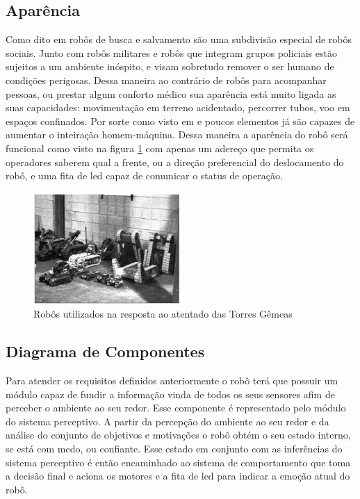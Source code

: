 \documentclass[
	article,			%
	11pt,				%
	oneside,			%
	a4paper,			%
	english,			%
	brazil,				%
	sumario=tradicional	
	]{abntex2}
\begin{document}
\subsection{Aparência}

Como dito em \cite{Robin2004} robôs de busca e salvamento são uma subdivisão especial de robôs sociais. Junto com robôs militares e robôs que integram grupos policiais estão sujeitos a um ambiente inóspito, e visam sobretudo remover o ser humano de condições perigosas. Dessa maneira ao contrário de robôs para acompanhar pessoas, ou prestar algum conforto médico sua aparência está muito ligada as suas capacidades: movimentação em terreno acidentado, percorrer tubos, voo em espaços confinados. Por sorte como visto em \cite{akgun2022using} e \cite{fin2004} poucos elementos já são capazes de aumentar o inteiração homem-máquina. Dessa maneira a aparência do robô será funcional como visto na figura \ref{figure:robo_wotc} com apenas um adereço que permita os operadores saberem qual a frente, ou a direção preferencial do deslocamento do robô, e uma fita de led capaz de comunicar o status de operação.

\begin{figure}
\centering
\includegraphics[width=0.5\textwidth]{robo-wotc.png} 
\caption{Robôs utilizados na resposta ao atentado das Torres Gêmeas }
\label{figure:robo_wotc}
\end{figure}

\subsection{Diagrama de Componentes}

Para atender os requisitos definidos anteriormente o robô terá que possuir um módulo capaz de fundir a informação vinda de todos os seus sensores afim de perceber o ambiente ao seu redor. Esse componente é representado pelo módulo do sistema perceptivo. A partir da percepção do ambiente ao seu redor e da análise do conjunto de objetivos e motivações o robô obtém o seu estado interno, se está com medo, ou confiante. Esse estado em conjunto com as inferências do sistema perceptivo é então encaminhado ao sistema de comportamento que toma a decisão final e aciona os motores e a fita de led para indicar a emoção atual do robô.
\end{document}
